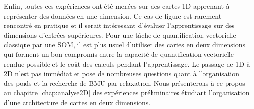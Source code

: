 \documentclass[../main]{subfiles}
\begin{document}
Enfin, toutes ces expériences ont été menées sur des cartes 1D apprenant à représenter des données en une dimension. Ce cas de figure est rarement rencontré en pratique et il serait intéressant d'évaluer l'apprentissage sur des dimensions d'entrées supérieures. Pour une tâche de quantification vectorielle classique par une SOM, il est plus usuel d'utiliser des cartes en deux dimensions qui forment un bon compromis entre la capacité de quantification vectorielle rendue possible et le coût des calculs pendant l'apprentissage. Le passage de 1D à 2D n'est pas immédiat et pose de nombreuses questions quant à l'organisation des poids et la recherche de BMU par relaxation. 
Nous présenterons à ce propos au chapitre \ref{chap:analyse2D} des expériences préliminaires étudiant l'organisation d'une architecture de cartes en deux dimensions.

\ifSubfilesClassLoaded{
    \printbibliography
}{}
\end{document}
